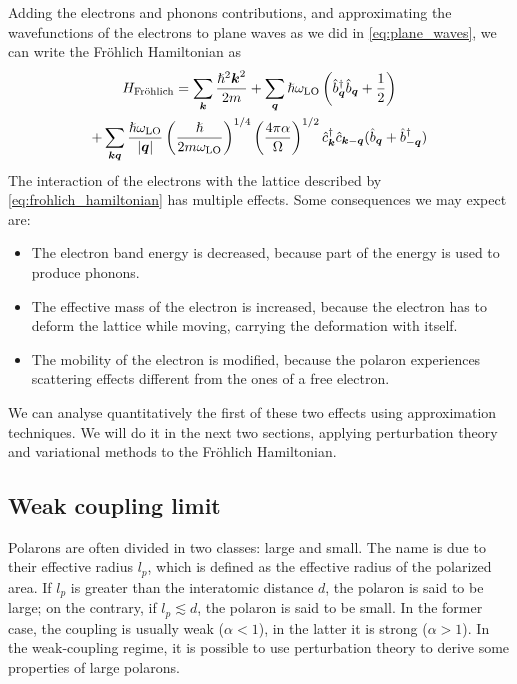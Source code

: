 Adding the electrons and phonons contributions, and approximating the wavefunctions of the electrons to plane waves as we did in \cref{eq:plane_waves}, we can write the Fr\"{o}hlich Hamiltonian as
\begin{multline} \label{eq:frohlich_hamiltonian}
    H_\text{Fr\"{o}hlich} = \sum_{\mathbf{\boldsymbol{k}}} \frac{\hslash^2\mathbf{\boldsymbol{k}}^2}{2m}
    + \sum_{\mathbf{\boldsymbol{q}}} \hslash \omega_\text{LO} \left( \hat{b}^\dagger_{ \mathbf{\boldsymbol{q}}} \hat{b}_{ \mathbf{\boldsymbol{q}}} + \frac{1}{2} \right)
    \\ + \sum_{\mathbf{\boldsymbol{k}}\mathbf{\boldsymbol{q}}} \frac{\hslash \omega_\text{LO}}{|\mathbf{\boldsymbol{q}}|} \left(\frac{\hslash}{2m\omega_\text{LO}}\right)^{1/4} \left(\frac{4\pi\alpha}{\Omega}\right)^{1/2} \hat{c}^\dagger_{\mathbf{\boldsymbol{k}}}\hat{c}_{\mathbf{\boldsymbol{k}}-\mathbf{\boldsymbol{q}}} (\hat{b}_{\mathbf{\boldsymbol{q}}} + \hat{b}^\dagger_{-\mathbf{\boldsymbol{q}}})
\end{multline}
The interaction of the electrons with the lattice described by \cref{eq:frohlich_hamiltonian} has multiple effects. Some consequences we may expect are:
\begin{itemize}
    \item The electron band energy is decreased, because part of the energy is used to produce phonons.
    \item The effective mass of the electron is increased, because the electron has to deform the lattice while moving, carrying the deformation with itself.
    \item The mobility of the electron is modified, because the polaron experiences scattering effects different from the ones of a free electron.
\end{itemize}
We can analyse quantitatively the first of these two effects using approximation techniques. We will do it in the next two sections, applying perturbation theory and variational methods to the Fr\"{o}hlich Hamiltonian.

\subsection{Weak coupling limit} \label{sec:weak_frohlich}
Polarons are often divided in two classes: large and small. The name is due to their effective radius $l_p$, which is defined as the effective radius of the polarized area. If $l_p$ is greater than the interatomic distance $d$, the polaron is said to be large; on the contrary, if $l_p \lesssim d$, the polaron is said to be small. In the former case, the coupling is usually weak ($\alpha < 1$), in the latter it is strong ($\alpha > 1$). In the weak-coupling regime, it is possible to use perturbation theory to derive some properties of large polarons.

